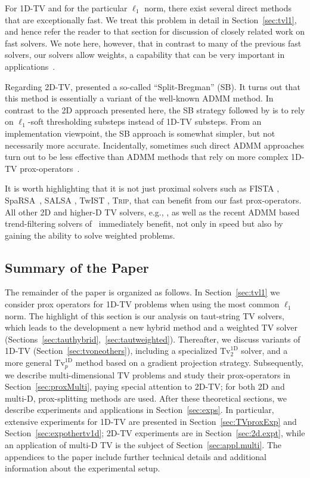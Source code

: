 \documentclass[twoside,11pt]{article}
\newcommand{\tvell}{\text{Tv}}
\newcommand{\trip}{\textsc{Trip}\xspace}
\newcommand{\oned}{\text{1D}}
\numberwithin{equation}{section}
\numberwithin{theorem}{section}
\begin{document}
For 1D-TV and for the particular $\ell_1$ norm, there exist several direct methods that are exceptionally fast. We treat this problem in detail in Section~\ref{sec:tvl1}, and hence refer the reader to that section for discussion of closely related work on fast solvers. We note here, however, that in contrast to many of the previous fast solvers, our solvers allow weights, a capability that can be very important in applications~\citep{jegBac13}.

Regarding 2D-TV, \citet{splitbreg} presented a so-called ``Split-Bregman'' (SB). It turns out that this method is essentially a variant of the well-known ADMM method. In contrast to the 2D approach presented here, the SB strategy followed by \citet{splitbreg} is to rely on $\ell_1$-soft thresholding substeps instead of 1D-TV substeps. From an implementation viewpoint, the SB approach is somewhat simpler, but not necessarily more accurate. Incidentally, sometimes such direct ADMM approaches turn out to be less effective than ADMM methods that rely on more complex 1D-TV prox-operators~\citep{ramdas}.

It is worth highlighting that it is not just proximal solvers such as FISTA \citep{fista}, SpaRSA~\citep{sparsa}, SALSA \citep{SALSA}, TwIST \citep{TwIST},  \trip \citep{KimICML10}, that can benefit from our fast prox-operators. All other 2D and higher-D TV solvers, e.g., \citep{YangTV}, as well as the recent ADMM based trend-filtering solvers of~\citet{trendf} immediately benefit, not only in speed but also by gaining the ability to solve weighted problems. %

\subsection{Summary of the Paper}
The remainder of the paper is organized as follows. In Section~\ref{sec:tvl1} we consider prox operators for 1D-TV problems when using the most common $\ell_1$ norm. The highlight of this section is our analysis on taut-string TV solvers, which leads to the development a new hybrid method and a weighted TV solver (Sections~\ref{sec:tauthybrid},~\ref{sec:tautweighted}). Thereafter, we discuss  variants of 1D-TV (Section~\ref{sec:tvoneothers}), including a specialized $\tvell_2^{\oned}$ solver, and a more general $\tvell_p^{\oned}$ method based on a gradient projection strategy. Subsequently, we describe multi-dimensional TV problems  and study their prox-operators in Section~\ref{sec:proxMulti}, paying special attention to 2D-TV; for both 2D and multi-D, prox-splitting methods are used. After these theoretical sections, we describe experiments and applications in Section~\ref{sec:exps}. In particular, extensive experiments for 1D-TV are presented in Section~\ref{sec:TVproxExp} and Section~\ref{sec:expothertv1d}; 2D-TV experiments are in Section~\ref{sec:2d.expt}, while an application of multi-D TV is the subject of Section~\ref{sec:appl.multi}. The appendices to the paper include further technical details and additional information about the experimental setup.  %
\end{document}
